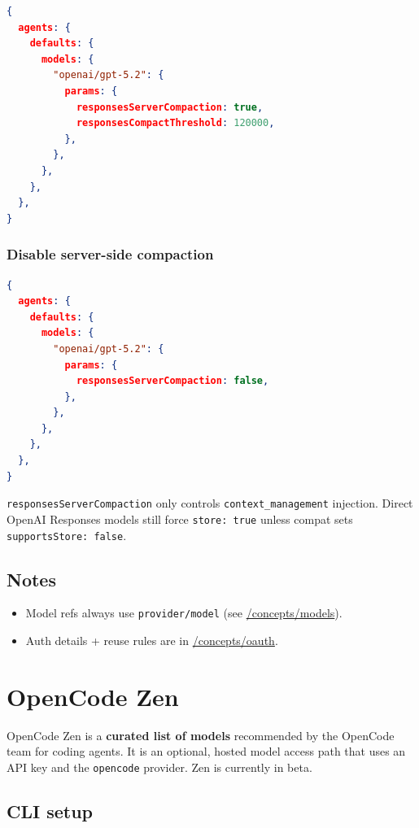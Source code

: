\begin{lstlisting}[language=json]
{
  agents: {
    defaults: {
      models: {
        "openai/gpt-5.2": {
          params: {
            responsesServerCompaction: true,
            responsesCompactThreshold: 120000,
          },
        },
      },
    },
  },
}
\end{lstlisting}


\subsubsection{Disable server-side compaction}


\begin{lstlisting}[language=json]
{
  agents: {
    defaults: {
      models: {
        "openai/gpt-5.2": {
          params: {
            responsesServerCompaction: false,
          },
        },
      },
    },
  },
}
\end{lstlisting}


\texttt{responsesServerCompaction} only controls \texttt{context\_management} injection.
Direct OpenAI Responses models still force \texttt{store: true} unless compat sets
\texttt{supportsStore: false}.

\subsection{Notes}


\begin{itemize}
  \item Model refs always use \texttt{provider/model} (see \href{/concepts/models}{/concepts/models}).
  \item Auth details + reuse rules are in \href{/concepts/oauth}{/concepts/oauth}.
\end{itemize}



\clearpage

\section{OpenCode Zen}


OpenCode Zen is a \textbf{curated list of models} recommended by the OpenCode team for coding agents.
It is an optional, hosted model access path that uses an API key and the \texttt{opencode} provider.
Zen is currently in beta.

\subsection{CLI setup}


